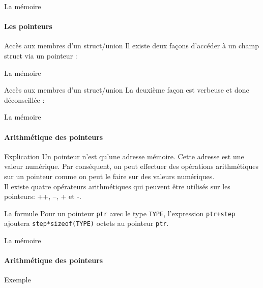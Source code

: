 \documentclass{beamer}
\begin{document}
\begin{darkframes}
	\begin{frame}{La mémoire}
		\framesubtitle{Les pointeurs}
		\begin{block}{Accès aux membres d'un struct/union}
			Il existe deux façons d'accéder à un champ struct via un pointeur :\\ 
			\ptrStructSyntaxOne
		\end{block}
	\end{frame}

	\begin{frame}{La mémoire}
		\begin{block}{Accès aux membres d'un struct/union}
			La deuxième façon est verbeuse et donc déconseillée :\\
			\ptrStructSyntaxTwo
		\end{block}
	\end{frame}
	
	\begin{frame}{La mémoire}
		\framesubtitle{Arithmétique des pointeurs}
		\begin{block}{Explication}
			Un pointeur n'est qu'une adresse mémoire. Cette adresse est une valeur numérique. Par conséquent, on peut effectuer des opérations arithmétiques sur un pointeur comme on peut le faire sur des valeurs numériques.\\ 
			Il existe quatre opérateurs arithmétiques qui peuvent être utilisés sur les pointeurs: \alert{++}, \alert{--}, \alert{+} et \alert{-}.
		\end{block}
		\begin{block}{La formule}
			Pour un pointeur \texttt{ptr} avec le type \texttt{TYPE}, l'expression \texttt{ptr+step} ajoutera \texttt{step*sizeof(TYPE)} octets au pointeur \texttt{ptr}.
		\end{block}
	\end{frame}
  	
  	\begin{frame}{La mémoire}
  		\framesubtitle{Arithmétique des pointeurs}
  		\begin{exampleblock}{Exemple}
  			\ptrArithExmp
  		\end{exampleblock}
  	

\end{frame}
\end{darkframes}
\end{document}
